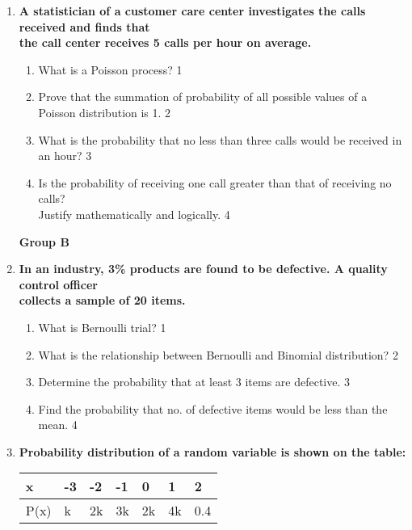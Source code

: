 \documentclass{article}
\begin{document}
\begin{enumerate}
 \item
  \textbf{A statistician of a customer care center investigates the calls received and finds that \\ the call center receives 5 calls per hour on average.}

  \begin{enumerate}
    \item
	What is a Poisson process? \hfill 1
    \item
    	Prove that the summation of probability of all possible values of a Poisson distribution is 1. \hfill 2
    \item
    	What is the probability that no less than three calls would be received in an hour? \hfill 3
     \item
     	Is the probability of receiving one call greater than that of receiving no calls? \\ Justify mathematically and logically. \hfill 4
  \end{enumerate}

\begin{center}
\textbf{Group B}
\end{center}

  \item
  \textbf{In an industry, 3\% products are found to be defective. A quality control officer \\ collects a sample of 20 items.}
 
  \begin{enumerate}
    \item
	What is Bernoulli trial? \hfill 1
    \item
    	What is the relationship between Bernoulli and Binomial distribution?  \hfill 2
    \item
    	Determine the probability that at least 3 items are defective. \hfill 3
     \item
     	Find the probability that no. of defective items would be less than the mean. \hfill 4 \\
  \end{enumerate}

 \item
  \textbf{Probability distribution of a random variable is shown on the table:}

\begin{table}[h]
\begin{center}
\begin{tabular}{lllllll}
\hline
x    & -3 & -2 & -1 & 0  & 1  & 2   \\ \hline
P(x) & k  & 2k & 3k & 2k & 4k & 0.4 \\ \hline
\end{tabular}
\end{center}
\end{table}


\end{enumerate}
\end{document}
